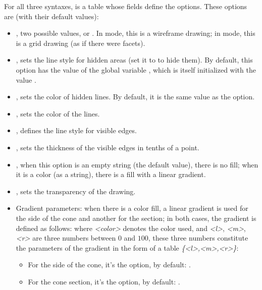 For all three syntaxes,  is a table whose fields define the options. These options are (with their default values):
\begin{itemize}
    \item {}, two possible values,  or . In  mode, this is a wireframe drawing; in  mode, this is a grid drawing (as if there were facets).

    \item {}, sets the line style for hidden areas (set it to  to hide them). By default, this option has the value of the global variable , which is itself initialized with the value .

    \item  {}, sets the color of hidden lines. By default, it is the same value as the  option.

    \item {}, sets the color of the lines.
    
    \item {}, defines the line style for visible edges.

    \item {}, sets the thickness of the visible edges in tenths of a point.    

    \item {}, when this option is an empty string (the default value), there is no fill; when it is a color (as a string), there is a fill with a linear gradient.

    \item {}, sets the transparency of the drawing.

    \item Gradient parameters: when there is a color fill, a linear gradient is used for the side of the cone and another for the section; in both cases, the gradient is defined as follows:
where \emph{<color>} denotes the color used, and \emph{<l>}, \emph{<m>}, \emph{<r>} are three numbers between $0$ and $100$, these three numbers constitute the parameters of the gradient in the form of a table \emph{\{<l>,<m>,<r>\}}:
        \begin{itemize}
            \item For the side of the cone, it's the  option, by default: .
            \item For the cone section, it's the  option, by default: .
        \end{itemize}
\end{itemize}

